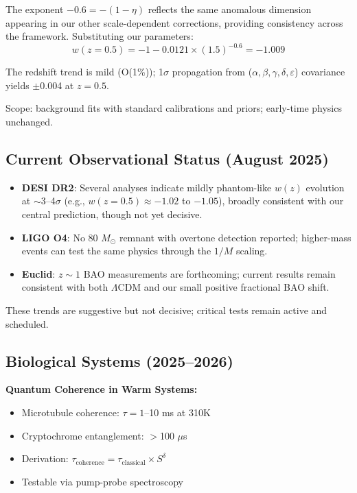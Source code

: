 \documentclass[aps,prd,preprint,onecolumn,nofootinbib,superscriptaddress,longbibliography]{revtex4-2}
\begin{document}
The exponent $-0.6 = -(1-\eta)$ reflects the same anomalous dimension appearing in our other scale-dependent corrections, providing consistency across the framework. Substituting our parameters:
\begin{equation}
w(z=0.5) = -1 - 0.0121 \times (1.5)^{-0.6} = -1.009
\end{equation}

The redshift trend is mild (O(1\%)); 1$\sigma$ propagation from ($\alpha,\beta,\gamma,\delta,\varepsilon$) covariance yields $\pm$0.004 at $z=0.5$.

Scope: background fits with standard calibrations and priors; early-time physics unchanged.

\subsection{Current Observational Status (August 2025)}

\begin{itemize}
\item \textbf{DESI DR2}: Several analyses indicate mildly phantom-like $w(z)$ evolution at $\sim$3--4$\sigma$ (e.g., $w(z=0.5) \approx -1.02$ to $-1.05$), broadly consistent with our central prediction, though not yet decisive.
\item \textbf{LIGO O4}: No 80 $M_\odot$ remnant with overtone detection reported; higher-mass events can test the same physics through the $1/M$ scaling.
\item \textbf{Euclid}: $z \sim 1$ BAO measurements are forthcoming; current results remain consistent with both $\Lambda$CDM and our small positive fractional BAO shift.
\end{itemize}

These trends are suggestive but not decisive; critical tests remain active and scheduled.

\subsection{Biological Systems (2025--2026)}

\textbf{Quantum Coherence in Warm Systems:}
\begin{itemize}
\item Microtubule coherence: $\tau = 1$--10 ms at 310K
\item Cryptochrome entanglement: $>$100 $\mu$s
\item Derivation: $\tau_{\text{coherence}} = \tau_{\text{classical}} \times S^\delta$
\item Testable via pump-probe spectroscopy
\end{itemize}
\end{document}
